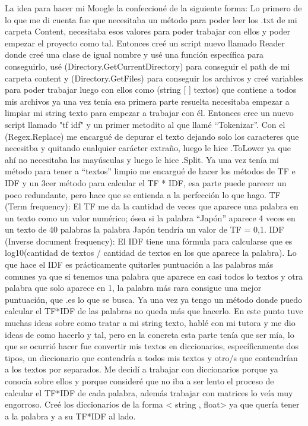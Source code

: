 \documentclass[a4paper,12pt]{article}
\begin{document}
La idea para hacer mi Moogle la confeccioné de la siguiente forma: 
Lo primero de lo que me di cuenta fue que necesitaba un método para poder leer los .txt de mi carpeta Content, necesitaba esos valores para poder trabajar con ellos y poder empezar el proyecto como tal. Entonces creé un script nuevo llamado Reader 
donde creé una clase de igual nombre y usé una función específica para conseguirlo, usé (Directory.GetCurrentDirectory) para conseguir el path de mi carpeta content y (Directory.GetFiles) para conseguir los archivos y creé variables para poder trabajar luego con ellos como (string [ ] textos) que contiene a todos mis archivos  
ya una vez tenía esa primera parte resuelta necesitaba empezar a limpiar mi string texto para empezar a trabajar con él.  
Entonces cree un nuevo script llamado  "tf idf"  y un primer metodito al que llamé “Tokenizar”. Con el (Regex.Replace) me encargué de depurar el texto dejando solo los caracteres que necesitba y quitando cualquier carácter extraño, luego le hice .ToLower ya que ahí no necesitaba las mayúsculas y luego le hice .Split. 
Ya una vez tenía mi método para tener a “textos” limpio me encargué de hacer los métodos de TF e IDF y un 3cer método para calcular el TF * IDF, esa parte puede parecer un poco redundante, pero hace que se entienda a la perfección lo que hago. 
TF (Term frequency): 
El TF me da la cantidad de veces que aparece una palabra en un texto como un valor numérico; ósea si la palabra “Japón” aparece 4 veces en un texto de 40 palabras la palabra Japón tendría un valor de TF = 0,1. 
IDF (Inverse document frequency): 
El IDF tiene una fórmula para calcularse que es log10(cantidad de textos / cantidad de textos en los que aparece la palabra). Lo que hace el IDF es prácticamente quitarles puntuación a las palabras más comunes ya que si tenemos una palabra que aparece en casi todos lo textos y otra palabra que solo aparece en 1, la palabra más rara consigue una mejor puntuación, que .es lo que se busca. 
Ya una vez ya tengo un método donde puedo calcular el TF*IDF de las palabras no queda más que hacerlo. En este punto tuve muchas ideas sobre como tratar a mi string texto, hablé con mi tutora y me dio ideas de como hacerlo y tal, pero en la concreta esta parte tenía que ser mía, lo que se ocurrió hacer fue convertir mis textos en diccionarios, específicamente dos tipos, un diccionario que contendría a todos mis textos y otro/s que contendrían a los textos por separados. Me decidí a trabajar con diccionarios porque ya conocía sobre ellos y porque consideré que no iba a ser lento el proceso de calcular el TF*IDF de cada palabra, además trabajar con matrices lo veía muy engorroso. 
Creé los diccionarios de la forma < string , float> ya que quería tener a la palabra y a su TF*IDF al lado. 
 
\end{document}

